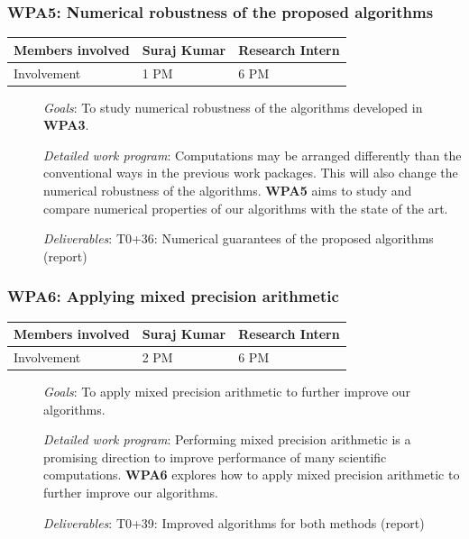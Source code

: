 \documentclass[a4paper,11pt]{article}
\newcommand{\subtask}[1]{{\color{orange}\paragraph{#1}$ $}}
\newcommand{\goal}{{\color{orange2}  \emph{Goals}:} }
\newcommand{\dwp}{{\color{orange2}  \emph{Detailed work program}: }}
\newcommand{\deliverables}{{\color{orange2}  \emph{Deliverables}: }}
\begin{document}
	\subsubsection{\textbf{WPA5}: Numerical robustness of the proposed algorithms}
	\begin{table}[H]
		\begin{tabular}{lll}
			\hline
			\cellcolor{blue2}
			Members involved & Suraj Kumar& Research Intern \\
			\hline
			\cellcolor{orange2}
			Involvement      & 1 PM            & 6 PM \\
			\hline
		\end{tabular}
	\end{table}
	\begin{description}
		\item[] \goal To study numerical robustness of the algorithms developed in \textbf{WPA3}.
		\item[] \dwp Computations may be arranged differently than the conventional ways in the previous work packages. This will also change the numerical robustness of the algorithms. \textbf{WPA5} aims to study and compare numerical properties of our algorithms with the state of the art. 
		\item[] \deliverables\newline
		T0+36: Numerical guarantees of the proposed algorithms (report)
	\end{description}
	\subsubsection{\textbf{WPA6}: Applying mixed precision arithmetic}
	\begin{table}[H]
		\begin{tabular}{lll}
			\hline
			\cellcolor{blue2}
			Members involved & Suraj Kumar& Research Intern \\
			\hline
			\cellcolor{orange2}
			Involvement      & 2 PM            & 6 PM \\
			\hline
		\end{tabular}
	\end{table}
	\begin{description}
		\item[] \goal To apply mixed precision arithmetic to further improve our algorithms.
		\item[] \dwp Performing mixed precision arithmetic is a promising direction to improve performance of many scientific computations. \textbf{WPA6} explores how to apply mixed precision arithmetic to further improve our algorithms.
		\item[] \deliverables\newline
		T0+39: Improved algorithms for both methods (report)
	\end{description}
	
\end{document}
